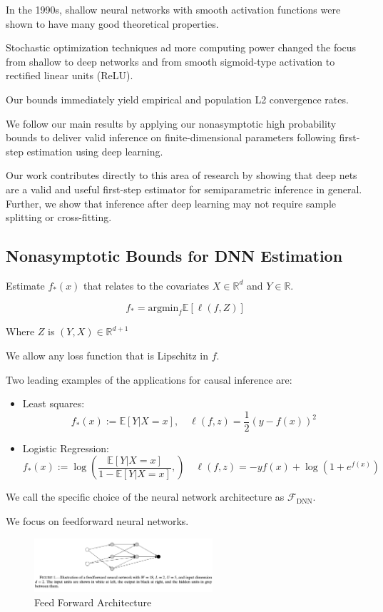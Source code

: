 \documentclass{article}
\begin{document}
In the 1990s, shallow neural networks with smooth activation functions were shown to have many good theoretical properties.

Stochastic optimization techniques ad more computing power changed the focus from shallow to deep networks and from smooth sigmoid-type activation to rectified linear units (ReLU).

Our bounds immediately yield empirical and population L2 convergence rates.

We follow our main results by applying our nonasymptotic high probability bounds to
deliver valid inference on ﬁnite-dimensional parameters following ﬁrst-step estimation using deep learning.

Our work contributes directly to this area of research by showing that deep nets are a valid and useful ﬁrst-step estimator for semiparametric inference in general. Further, we show that inference after deep learning may not require sample splitting or cross-ﬁtting.

\subsection{Nonasymptotic Bounds for DNN Estimation}
Estimate $f_* (x)$ that relates to the covariates $X \in \mathbb{R}^d$ and $Y \in \mathbb{R}$.

$$
f_* = \text{argmin}_f \mathbb{E}[\ell (f, Z)]
$$

Where $Z$ is $(Y, X) \in \mathbb{R}^{d+1}$

We allow any loss function that is Lipschitz in $f$.

Two leading examples of the applications for causal inference are:

\begin{itemize}
  \item Least squares:
  $$
  f_* (x) := \mathbb{E}[Y | X = x],
  \quad
  \ell(f, z) = \frac{1}{2}(y - f(x))^2
  $$
  \item Logistic Regression:
  $$
  f_* (x) := \log \left(
    \frac{\mathbb{E}[Y | X = x]}{1 - \mathbb{E}[Y | X = x]},
  \right)
  \quad
  \ell(f, z) = -y f(x) + \log(1 + e^{f(x)})
  $$
\end{itemize}

We call the specific choice of the neural network architecture as $\mathcal{F}_{\text{DNN}}$.

We focus on feedforward neural networks.

\begin{figure}[H]
  \centering
  \includegraphics[width=250px]{draft-photos/dnn-for-estimation/feed_forward_dnn.png}
  \caption{Feed Forward Architecture}
  \label{fig:feed_forward_dnn}
\end{figure}
\end{document}
